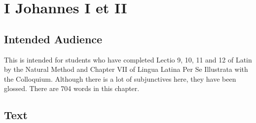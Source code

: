 \chapter{I Johannes I et II}


\section{Intended Audience}
This is intended for students who have completed Lectio 9, 10, 11 and 12 of Latin by the Natural Method and Chapter VII of Lingua Latina Per Se Illustrata with the Colloquium. Although there is a lot of subjunctives here, they have been glossed. There are 704 words in this chapter.

\section{Text}

